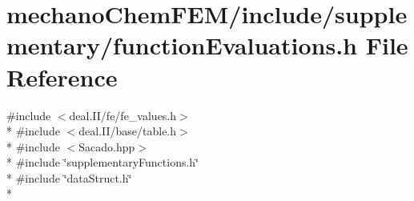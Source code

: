\section{mechano\-Chem\-F\-E\-M/include/supplementary/function\-Evaluations.h File Reference}
\label{function_evaluations_8h}
{\ttfamily \#include $<$deal.\-I\-I/fe/fe\-\_\-values.\-h$>$}\\*
{\ttfamily \#include $<$deal.\-I\-I/base/table.\-h$>$}\\*
{\ttfamily \#include $<$Sacado.\-hpp$>$}\\*
{\ttfamily \#include \char`\"{}supplementary\-Functions.\-h\char`\"{}}\\*
{\ttfamily \#include \char`\"{}data\-Struct.\-h\char`\"{}}\\*
